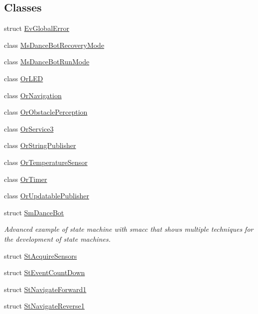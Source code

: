\subsection*{Classes}
\begin{DoxyCompactItemize}
\item 
struct \hyperlink{structsm__dance__bot__3_1_1EvGlobalError}{Ev\+Global\+Error}
\item 
class \hyperlink{classsm__dance__bot__3_1_1MsDanceBotRecoveryMode}{Ms\+Dance\+Bot\+Recovery\+Mode}
\item 
class \hyperlink{classsm__dance__bot__3_1_1MsDanceBotRunMode}{Ms\+Dance\+Bot\+Run\+Mode}
\item 
class \hyperlink{classsm__dance__bot__3_1_1OrLED}{Or\+L\+ED}
\item 
class \hyperlink{classsm__dance__bot__3_1_1OrNavigation}{Or\+Navigation}
\item 
class \hyperlink{classsm__dance__bot__3_1_1OrObstaclePerception}{Or\+Obstacle\+Perception}
\item 
class \hyperlink{classsm__dance__bot__3_1_1OrService3}{Or\+Service3}
\item 
class \hyperlink{classsm__dance__bot__3_1_1OrStringPublisher}{Or\+String\+Publisher}
\item 
class \hyperlink{classsm__dance__bot__3_1_1OrTemperatureSensor}{Or\+Temperature\+Sensor}
\item 
class \hyperlink{classsm__dance__bot__3_1_1OrTimer}{Or\+Timer}
\item 
class \hyperlink{classsm__dance__bot__3_1_1OrUpdatablePublisher}{Or\+Updatable\+Publisher}
\item 
struct \hyperlink{structsm__dance__bot__3_1_1SmDanceBot}{Sm\+Dance\+Bot}
\begin{DoxyCompactList}\small\item\em Advanced example of state machine with smacc that shows multiple techniques for the development of state machines. \end{DoxyCompactList}\item 
struct \hyperlink{structsm__dance__bot__3_1_1StAcquireSensors}{St\+Acquire\+Sensors}
\item 
struct \hyperlink{structsm__dance__bot__3_1_1StEventCountDown}{St\+Event\+Count\+Down}
\item 
struct \hyperlink{structsm__dance__bot__3_1_1StNavigateForward1}{St\+Navigate\+Forward1}
\item 
struct \hyperlink{structsm__dance__bot__3_1_1StNavigateReverse1}{St\+Navigate\+Reverse1}

\end{DoxyCompactItemize}
